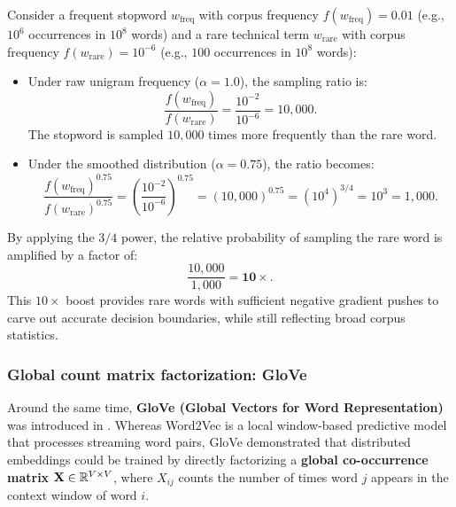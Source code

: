 \documentclass[../../../main.tex]{subfiles}
\begin{document}
Consider a frequent stopword $w_{\text{freq}}$ with corpus frequency $f(w_{\text{freq}}) = 0.01$ (e.g., $10^6$ occurrences in $10^8$ words) and a rare technical term $w_{\text{rare}}$ with corpus frequency $f(w_{\text{rare}}) = 10^{-6}$ (e.g., $100$ occurrences in $10^8$ words):
\begin{itemize}
    \item Under raw unigram frequency ($\alpha = 1.0$), the sampling ratio is:
    \begin{equation}
    \label{eq:ratio_raw}
    \frac{f(w_{\text{freq}})}{f(w_{\text{rare}})} = \frac{10^{-2}}{10^{-6}} = 10{,}000.
    \end{equation}
    The stopword is sampled $10{,}000$ times more frequently than the rare word.
    
    \item Under the smoothed distribution ($\alpha = 0.75$), the ratio becomes:
    \begin{equation}
    \label{eq:ratio_smoothed}
    \frac{f(w_{\text{freq}})^{0.75}}{f(w_{\text{rare}})^{0.75}} = \left( \frac{10^{-2}}{10^{-6}} \right)^{0.75} = (10{,}000)^{0.75} = (10^4)^{3/4} = 10^3 = 1{,}000.
    \end{equation}
\end{itemize}
By applying the $3/4$ power, the relative probability of sampling the rare word is amplified by a factor of:
\begin{equation}
\label{eq:boost_factor}
\frac{10{,}000}{1{,}000} = \mathbf{10\times}.
\end{equation}
This $10\times$ boost provides rare words with sufficient negative gradient pushes to carve out accurate decision boundaries, while still reflecting broad corpus statistics.

\subsubsection{Global count matrix factorization: GloVe}
\label{subsec:glove_comparison}

Around the same time, \textbf{GloVe (Global Vectors for Word Representation)} was introduced in \cite{pennington2014glove}. Whereas Word2Vec is a local window-based predictive model that processes streaming word pairs, GloVe demonstrated that distributed embeddings could be trained by directly factorizing a \textbf{global co-occurrence matrix} $\mathbf{X} \in \mathbb{R}^{V \times V}$, where $X_{ij}$ counts the number of times word $j$ appears in the context window of word $i$.
\end{document}
